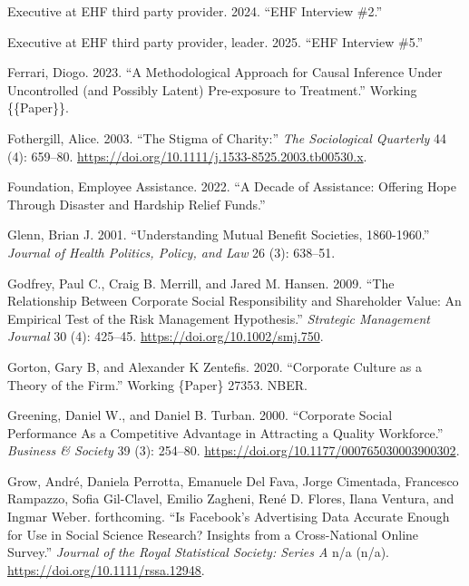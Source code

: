 \documentclass[
  11pt,
  oneside]{article}
\newlength{\cslhangindent}
\newenvironment{CSLReferences}[2] %
 {\begin{list}{}{%
  \setlength{\itemindent}{0pt}
  \setlength{\leftmargin}{0pt}
  \setlength{\parsep}{0pt}
  \ifodd #1
   \setlength{\leftmargin}{\cslhangindent}
   \setlength{\itemindent}{-1\cslhangindent}
  \fi
  \setlength{\itemsep}{#2\baselineskip}}}
 {\end{list}}
\begin{document}
\begin{CSLReferences}{1}{0}
Executive at EHF third party provider. 2024. {``{EHF} Interview \#2.''}

Executive at EHF third party provider, leader. 2025. {``{EHF} Interview \#5.''}

Ferrari, Diogo. 2023. {``A {Methodological Approach} for {Causal Inference} Under {Uncontrolled} (and {Possibly Latent}) {Pre-exposure} to {Treatment}.''} Working \{\{Paper\}\}.

Fothergill, Alice. 2003. {``The {Stigma} of {Charity}:''} \emph{The Sociological Quarterly} 44 (4): 659--80. \url{https://doi.org/10.1111/j.1533-8525.2003.tb00530.x}.

Foundation, Employee Assistance. 2022. {``A {Decade} of {Assistance}: Offering Hope Through Disaster and Hardship Relief Funds.''}

Glenn, Brian J. 2001. {``Understanding {Mutual} {Benefit} {Societies}, 1860-1960.''} \emph{Journal of Health Politics, Policy, and Law} 26 (3): 638--51.

Godfrey, Paul C., Craig B. Merrill, and Jared M. Hansen. 2009. {``The Relationship Between Corporate Social Responsibility and Shareholder Value: An Empirical Test of the Risk Management Hypothesis.''} \emph{Strategic Management Journal} 30 (4): 425--45. \url{https://doi.org/10.1002/smj.750}.

Gorton, Gary B, and Alexander K Zentefis. 2020. {``Corporate {Culture} as a {Theory} of the {Firm}.''} Working \{Paper\} 27353. NBER.

Greening, Daniel W., and Daniel B. Turban. 2000. {``Corporate {Social Performance As} a {Competitive Advantage} in {Attracting} a {Quality Workforce}.''} \emph{Business \& Society} 39 (3): 254--80. \url{https://doi.org/10.1177/000765030003900302}.

Grow, André, Daniela Perrotta, Emanuele Del Fava, Jorge Cimentada, Francesco Rampazzo, Sofia Gil-Clavel, Emilio Zagheni, René D. Flores, Ilana Ventura, and Ingmar Weber. forthcoming. {``Is {Facebook}'s Advertising Data Accurate Enough for Use in Social Science Research? {Insights} from a Cross-National Online Survey.''} \emph{Journal of the Royal Statistical Society: Series A} n/a (n/a). \url{https://doi.org/10.1111/rssa.12948}.


\end{CSLReferences}
\end{document}

